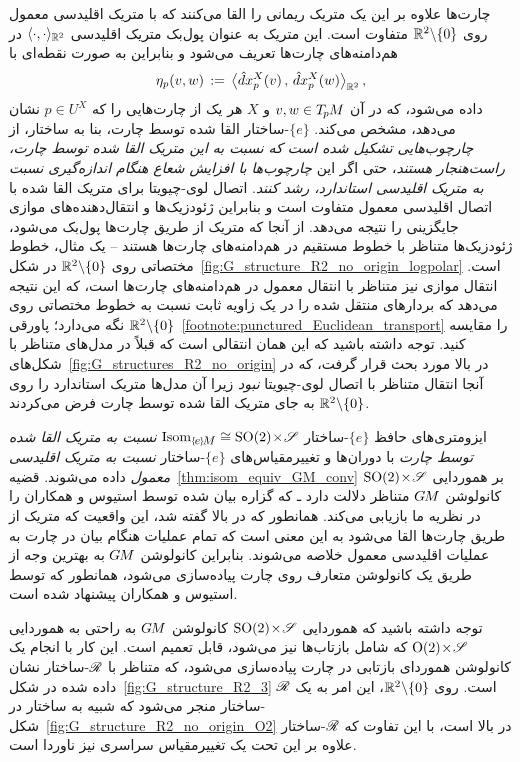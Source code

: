 چارت‌ها علاوه بر این یک متریک ریمانی را القا می‌کنند که با متریک اقلیدسی معمول روی $\mathbb{R}^2 \backslash \{0\}$ متفاوت است.
این متریک به عنوان پول‌بک متریک اقلیدسی $\langle \cdot,\cdot \rangle_{\mathbb{R}^2}$ در هم‌دامنه‌های چارت‌ها تعریف می‌شود و بنابراین به صورت نقطه‌ای با
\begin{align}
	\eta_p(v,w) \,:=\, \big\langle \hat{d}x^X_p(v) \,,\, \hat{d}x^X_p(w) \big\rangle_{\mathbb{R}^2} \,,
\end{align}
داده می‌شود، که در آن $v,w \in T_{\mkern-1.5mu p}\mkern-.5muM$ و $X$ هر یک از چارت‌هایی را که $p\in U^X$ نشان می‌دهد، مشخص می‌کند.
$\{e\}$-ساختار القا شده توسط چارت، بنا به ساختار، از \emph{چارچوب‌هایی تشکیل شده است که نسبت به این متریک القا شده توسط چارت، راست‌هنجار هستند}، حتی اگر این \emph{چارچوب‌ها با افزایش شعاع هنگام اندازه‌گیری نسبت به متریک اقلیدسی استاندارد، رشد کنند}.
اتصال لوی-چیویتا برای متریک القا شده با اتصال اقلیدسی معمول متفاوت است و بنابراین ژئودزیک‌ها و انتقال‌دهنده‌های موازی جایگزینی را نتیجه می‌دهد.
از آنجا که متریک از طریق چارت‌ها پول‌بک می‌شود، ژئودزیک‌ها متناظر با خطوط مستقیم در هم‌دامنه‌های چارت‌ها هستند -- یک مثال، خطوط مختصاتی روی $\mathbb{R}^2 \backslash \{0\}$ در شکل~\ref{fig:G_structure_R2_no_origin_logpolar} است.
انتقال موازی نیز متناظر با انتقال معمول در هم‌دامنه‌های چارت‌ها است، که این نتیجه می‌دهد که بردارهای منتقل شده را در یک زاویه ثابت نسبت به خطوط مختصاتی روی $\mathbb{R}^2 \backslash \{0\}$ نگه می‌دارد؛ پاورقی~\ref{footnote:punctured_Euclidean_transport} را مقایسه کنید.
توجه داشته باشید که این همان انتقالی است که قبلاً در مدل‌های متناظر با شکل‌های~\ref{fig:G_structures_R2_no_origin} در بالا مورد بحث قرار گرفت، که در آنجا انتقال متناظر با اتصال لوی-چیویتا \emph{نبود} زیرا آن مدل‌ها متریک استاندارد را روی $\mathbb{R}^2 \backslash \{0\}$ به جای متریک القا شده توسط چارت فرض می‌کردند.

ایزومتری‌های حافظ $\{e\}$-ساختار $\IsomeM \cong {\SO2 \!\times\! \Scale}$ \emph{نسبت به متریک القا شده توسط چارت} با دوران‌ها و تغییرمقیاس‌های $\{e\}$-ساختار \emph{نسبت به متریک اقلیدسی معمول} داده می‌شوند.
قضیه~\ref{thm:isom_equiv_GM_conv} بر هموردایی ${\operatorname{SO}(2) \!\times\! \mathscr{S}}$ کانولوشن $G\mkern-1.4muM$ متناظر دلالت دارد ـ که گزاره بیان شده توسط استیوس و همکاران \cite{esteves2017polar} را در نظریه ما بازیابی می‌کند.
همانطور که در بالا گفته شد، این واقعیت که متریک از طریق چارت‌ها القا می‌شود به این معنی است که تمام عملیات هنگام بیان در چارت به عملیات اقلیدسی معمول خلاصه می‌شوند.
بنابراین کانولوشن $G\mkern-1.4muM$ به بهترین وجه از طریق یک کانولوشن متعارف روی چارت پیاده‌سازی می‌شود، همانطور که توسط استیوس و همکاران\cite{esteves2017polar} پیشنهاد شده است.

توجه داشته باشید که هموردایی ${\operatorname{SO}(2) \!\times\! \mathscr{S}}$ کانولوشن $G\mkern-1.4muM$ به راحتی به هموردایی ${\operatorname{O}(2) \!\times\! \mathscr{S}}$ که شامل بازتاب‌ها نیز می‌شود، قابل تعمیم است.
این کار با انجام یک کانولوشن هموردای بازتابی در چارت پیاده‌سازی می‌شود، که متناظر با $\mathscr{R}$-ساختار نشان داده شده در شکل~\ref{fig:G_structure_R2_3} است.
روی $\mathbb{R}^2 \backslash \{0\}$، این امر به یک $\mathscr{R}$-ساختار منجر می‌شود که شبیه به ساختار در شکل~\ref{fig:G_structure_R2_no_origin_O2} در بالا است، با این تفاوت که $\mathscr{R}$-ساختار علاوه بر این تحت یک تغییرمقیاس سراسری نیز ناوردا است.